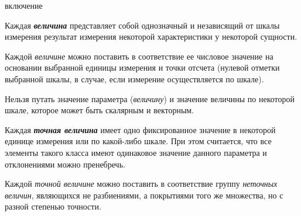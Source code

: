\begin{SCn}
	
	
	

\begin{scnrelfromlist}{включение}
\end{scnrelfromlist}
\end{SCn}

Каждая \textbf{\textit{величина}} представляет собой однозначный и независящий от шкалы измерения результат измерения некоторой характеристики у некоторой сущности.
		
Каждой \textit{величине} можно поставить в соответствие ее числовое значение на основании выбранной единицы измерения и точки отсчета (нулевой отметки выбранной шкалы, в случае, если измерение осуществляется по шкале).
		
Нельзя путать значение параметра (\textit{величину}) и значение величины по некоторой шкале, которое может быть скалярным и векторным.
	
\begin{SCn}
\end{SCn}

Каждая \textbf{\textit{точная величина}} имеет одно фиксированное значение в некоторой единице измерения или по какой-либо шкале. При этом считается, что все элементы такого класса имеют одинаковое значение данного параметра и отклонениями можно пренебречь.
		
Каждой \textit{точной величине} можно поставить в соответствие группу \textit{неточных величин}, являющихся не разбиениями, а покрытиями того же множества, но с разной степенью точности.

